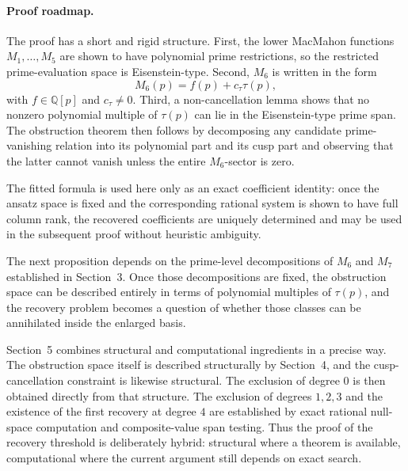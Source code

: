 \paragraph{Proof roadmap.}
The proof has a short and rigid structure. First, the lower MacMahon functions $M_1,\dots,M_5$ are shown to have polynomial prime restrictions, so the restricted prime-evaluation space is Eisenstein-type. Second, $M_6$ is written in the form
\[
M_6(p)=f(p)+c_\tau\tau(p),
\]
with $f\in\mathbb Q[p]$ and $c_\tau\neq 0$. Third, a non-cancellation lemma shows that no nonzero polynomial multiple of $\tau(p)$ can lie in the Eisenstein-type prime span. The obstruction theorem then follows by decomposing any candidate prime-vanishing relation into its polynomial part and its cusp part and observing that the latter cannot vanish unless the entire $M_6$-sector is zero.

The fitted formula is used here only as an exact coefficient identity: once the ansatz space is fixed and the corresponding rational system is shown to have full column rank, the recovered coefficients are uniquely determined and may be used in the subsequent proof without heuristic ambiguity.

The next proposition depends on the prime-level decompositions of $M_6$ and $M_7$ established in Section~3. Once those decompositions are fixed, the obstruction space can be described entirely in terms of polynomial multiples of $\tau(p)$, and the recovery problem becomes a question of whether those classes can be annihilated inside the enlarged basis.

Section~5 combines structural and computational ingredients in a precise way. The obstruction space itself is described structurally by Section~4, and the cusp-cancellation constraint is likewise structural. The exclusion of degree $0$ is then obtained directly from that structure. The exclusion of degrees $1,2,3$ and the existence of the first recovery at degree $4$ are established by exact rational null-space computation and composite-value span testing. Thus the proof of the recovery threshold is deliberately hybrid: structural where a theorem is available, computational where the current argument still depends on exact search.

